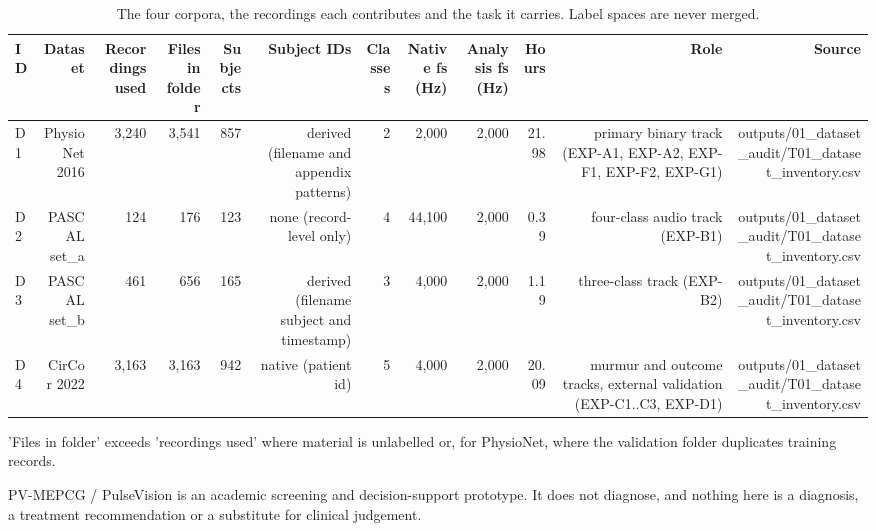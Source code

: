 \begin{table}[htbp]
  \centering
  \caption{The four corpora, the recordings each contributes and the task it carries. Label spaces are never merged.}
  \label{tab:q1_t01}
  \begin{tabular}{lrrrrrrrrrrr}
    \toprule
    ID & Dataset & Recordings used & Files in folder & Subjects & Subject IDs & Classes & Native fs (Hz) & Analysis fs (Hz) & Hours & Role & Source \\
    \midrule
    D1 & PhysioNet 2016 & 3,240 & 3,541 & 857 & derived (filename and appendix patterns) & 2 & 2,000 & 2,000 & 21.98 & primary binary track (EXP-A1, EXP-A2, EXP-F1, EXP-F2, EXP-G1) & outputs/01\_dataset\_audit/T01\_dataset\_inventory.csv \\
    D2 & PASCAL set\_a & 124 & 176 & 123 & none (record-level only) & 4 & 44,100 & 2,000 & 0.39 & four-class audio track (EXP-B1) & outputs/01\_dataset\_audit/T01\_dataset\_inventory.csv \\
    D3 & PASCAL set\_b & 461 & 656 & 165 & derived (filename subject and timestamp) & 3 & 4,000 & 2,000 & 1.19 & three-class track (EXP-B2) & outputs/01\_dataset\_audit/T01\_dataset\_inventory.csv \\
    D4 & CirCor 2022 & 3,163 & 3,163 & 942 & native (patient id) & 5 & 4,000 & 2,000 & 20.09 & murmur and outcome tracks, external validation (EXP-C1..C3, EXP-D1) & outputs/01\_dataset\_audit/T01\_dataset\_inventory.csv \\
    \bottomrule
  \end{tabular}
  \par\footnotesize 'Files in folder' exceeds 'recordings used' where material is unlabelled or, for PhysioNet, where the validation folder duplicates training records.
  \par\footnotesize PV-MEPCG / PulseVision is an academic screening and decision-support prototype. It does not diagnose, and nothing here is a diagnosis, a treatment recommendation or a substitute for clinical judgement.
\end{table}
